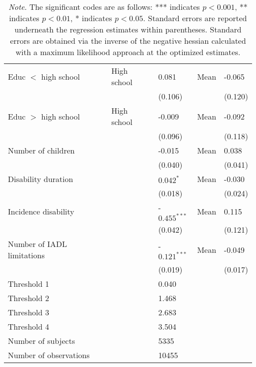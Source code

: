 \documentclass[12pt]{article}
\begin{document}
\begin{table}[h!]
\begin{tabular}{ll l l l}
Educ $<$ high school        & High school      & 0.081          & Mean      & -0.065\\
                            &                  & (0.106)        &           &  (0.120)\\
Educ $>$ high school        & High school      & -0.009         & Mean      & -0.092\\
                            &                  &  (0.096)       &           &  (0.118)\\
Number of children          &                  & -0.015         & Mean      &  0.038\\
                            &                  &  (0.040)       &           &  (0.041)\\
Disability duration         &                  &  $0.042^{*}$   & Mean      & -0.030\\
                            &                  &  (0.018)       &           &  (0.024)  \\
Incidence disability        &                  & -$0.455^{***}$ & Mean      &  0.115\\
                            &                  & (0.042)        &           &  (0.121)\\
Number of IADL limitations  &                  & -$0.121^{***}$ & Mean      & -0.049  \\
                            &                  & (0.019)        &           &  (0.017)\\
Threshold 1                 &                  & 0.040          &&\\
Threshold 2                 &                  & 1.468          &&\\
Threshold 3                 &                  & 2.683          &&\\
Threshold 4                 &                  & 3.504          &&\\
Number of subjects          &                  & 5335           &&\\
Number of observations      &                  & 10455          &&\\
\hline
\end{tabular}
\caption*{\footnotesize{\textit{Note}. The significant codes are as follows: *** indicates $p < 0.001$, ** indicates $p < 0.01$, * indicates $p <0.05$. Standard errors are reported underneath the regression estimates within parentheses. Standard errors are obtained via the inverse of the negative hessian calculated with a maximum likelihood approach at the optimized estimates.}}
\end{table}
\end{document}
